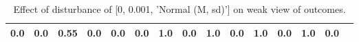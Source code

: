 \begin{table}
\begin{tabular}{l|cc|cc|cc|cc|cc|cc|cc}
\cellcolor{Bittersweet}0.0&\cellcolor{Bittersweet}0.0&\cellcolor{Bittersweet}0.55&\cellcolor{Bittersweet}0.0&\cellcolor{Bittersweet}0.0&\cellcolor{Bittersweet}0.0&\cellcolor{Bittersweet}1.0&\cellcolor{Bittersweet}0.0&\cellcolor{Bittersweet}1.0&\cellcolor{Bittersweet}0.0&\cellcolor{Bittersweet}1.0&\cellcolor{Bittersweet}0.0&\cellcolor{Bittersweet}1.0&\cellcolor{Bittersweet}0.0\\\bottomrule\end{tabular}\caption{Effect of disturbance of [0, 0.001, 'Normal (M, sd)'] on weak view of outcomes.}\end{table}